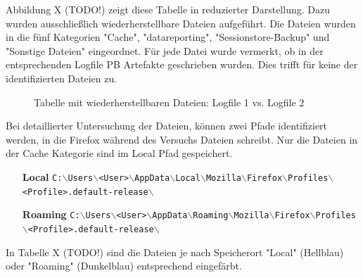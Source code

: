 \begin{appendices}
Abbildung X (TODO!) zeigt diese Tabelle in reduzierter Darstellung.
Dazu wurden ausschließlich wiederherstellbare Dateien aufgeführt. 
Die Dateien wurden in die fünf Kategorien "Cache", "datareporting", "Sessionstore-Backup" und "Sonstige Dateien" eingeordnet.
Für jede Datei wurde vermerkt, ob in der entsprechenden Logfile PB Artefakte geschrieben wurden.
Dies trifft für keine der identifizierten Dateien zu.
\begin{figure}[h!]
	\caption{Tabelle mit wiederherstellbaren Dateien: Logfile 1 vs. Logfile 2}
\end{figure}

Bei detaillierter Untersuchung der Dateien, können zwei Pfade identifiziert werden, in die Firefox während des Versuchs Dateien schreibt. Nur die Dateien in der Cache Kategorie sind im Local Pfad gespeichert.
\begin{itemize}
\item[\textbf{Local}] \texttt{C:$\backslash$Users$\backslash$<User>$\backslash$AppData$\backslash$Local$\backslash$Mozilla$\backslash$Firefox$\backslash$Profiles$\backslash$<Profile>.default-release$\backslash$}
\item[\textbf{Roaming}] \texttt{C:$\backslash$Users$\backslash$<User>$\backslash$AppData$\backslash$Roaming$\backslash$Mozilla$\backslash$Firefox$\backslash$Profiles$\backslash$<Profile>.default-release$\backslash$}
\end{itemize}
In Tabelle X (TODO!) sind die Dateien je nach Speicherort "Local" (Hellblau) oder "Roaming" (Dunkelblau) entsprechend eingefärbt. 


\end{appendices}
